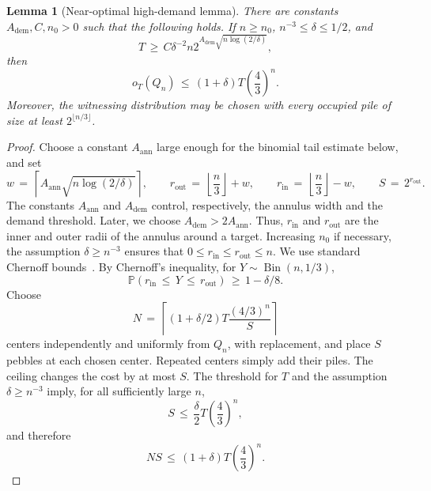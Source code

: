 \documentclass[11pt]{article}
\newcommand{\rin}{r_{\mathrm{in}}}
\newcommand{\rout}{r_{\mathrm{out}}}
\newcommand{\Aann}{A_{\mathrm{ann}}}
\newcommand{\Adem}{A_{\mathrm{dem}}}
\theoremstyle{plain}
\newtheorem{lemma}[theorem]{Lemma}
\theoremstyle{definition}
\begin{document}
\begin{lemma}[Near-optimal high-demand lemma]\label{lem:high-demand}
There are constants $\Adem,C,n_0>0$ such that the following holds.  If $n\ge n_0$,
$n^{-3}\le \delta\le 1/2$, and
\[
T\,\ge\, C\delta^{-2}n2^{\Adem\sqrt{n\log(2/\delta)}},
\]
then
\[
o_T(Q_n)\,\le\, (1+\delta)T\left(\frac43\right)^n.
\]
Moreover, the witnessing distribution may be chosen with every occupied pile of size at
least $2^{\lfloor n/3\rfloor}$.
\end{lemma}
\begin{proof}
Choose a constant $\Aann$ large enough for the binomial tail estimate
below, and set
\[
w\,=\,\left\lceil \Aann\sqrt{n\log(2/\delta)}\right\rceil,\qquad
\rout\,=\,\left\lfloor\frac n3\right\rfloor+w,\qquad
\rin\,=\,\left\lfloor\frac n3\right\rfloor-w,\qquad
S\,=\,2^{\rout}.
\]
The constants $\Aann$ and $\Adem$ control, respectively, the annulus width and the demand
threshold. Later, we choose $\Adem>2\Aann$.  Thus, $\rin$ and $\rout$ are the inner and
outer radii of the annulus around a target.
\label{def:annulus}
Increasing $n_0$ if necessary, the assumption $\delta\ge n^{-3}$ ensures that
$0\le \rin\le \rout\le n$.
We use standard Chernoff bounds~\cite{AlonSpencer}.  By Chernoff's inequality, for
$Y\sim\operatorname{Bin}(n,1/3)$,
\[
\mathbb P(\rin\,\le\, Y\,\le\, \rout)\,\ge\, 1-\delta/8.
\]
Choose
\[
N\,=\,\left\lceil (1+\delta/2)T\frac{(4/3)^n}{S}\right\rceil
\]
centers independently and uniformly from $Q_n$, with replacement, and place $S$ pebbles at
each chosen center.  Repeated centers simply add their piles.
The ceiling changes the cost by at most $S$.  The threshold for $T$ and the assumption
$\delta\ge n^{-3}$ imply, for all sufficiently large $n$,
\[
S\,\le\, \frac{\delta}{2}T\left(\frac43\right)^n,
\]
and therefore
\[
NS\,\le\, (1+\delta)T\left(\frac43\right)^n.
\]


\end{proof}
\end{document}
